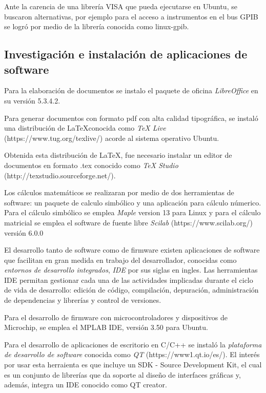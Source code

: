 \documentclass[paper=letter,oneside,fontsize=12pt, parskip=full]{article}
\begin{document}
	Ante la carencia de una librería VISA que pueda ejecutarse en Ubuntu, se buscaron alternativas, por ejemplo para el acceso a instrumentos en el bus GPIB se logró por medio de la librería conocida como linux-gpib.
	
	\subsection{Investigación e instalación de aplicaciones de software}
	
	Para la elaboración de documentos se instalo el paquete de oficina \emph{LibreOffice} en su versión 5.3.4.2.
	
	Para generar documentos con formato pdf con alta calidad tipográfica, se instaló una distribución de \LaTeX conocida como \emph{TeX Live} (https://www.tug.org/texlive/) acorde al sistema operativo Ubuntu. 
	
	Obtenida esta distribución de \LaTeX, fue necesario instalar un editor de documentos en formato .tex conocido como \emph{TeX Studio} (http://texstudio.sourceforge.net/). 
	
	Los cálculos matemáticos se realizaran por medio de dos herramientas de software: un paquete de calculo simbólico y una aplicación para cálculo númerico. Para el cálculo simbólico se emplea \emph{Maple} version 13 para Linux y para el cálculo matricial se emplea el software de fuente libre \emph{Scilab} (https://www.scilab.org/) versión 6.0.0
	
	El desarrollo tanto de software como de firmware existen aplicaciones de software que facilitan en gran medida en trabajo del desarrollador, conocidas como \emph{entornos de desarrollo integrados}, \emph{IDE} por sus siglas en ingles. Las herramientas IDE permitan gestionar cada una de las actividades implicadas durante el ciclo de vida de desarrollo: edición de código, compilación,  depuración, administración de dependencias y librerías y control de versiones.
	
	Para el desarrollo de firmware con microcontroladores y dispositivos de Microchip, se emplea el MPLAB IDE, versión 3.50 para Ubuntu.
	
	Para el desarrollo de aplicaciones de escritorio en C/C++ se instaló la \emph{plataforma de desarrollo de software} conocida como \emph{QT} (https://www1.qt.io/es/). El interés por usar esta herraienta es que incluye un SDK - Source Development Kit, el cual es un conjunto de librerías que da soporte al diseño de interfaces gráficas y, además, integra un IDE conocido como QT creator.
	
\end{document}
